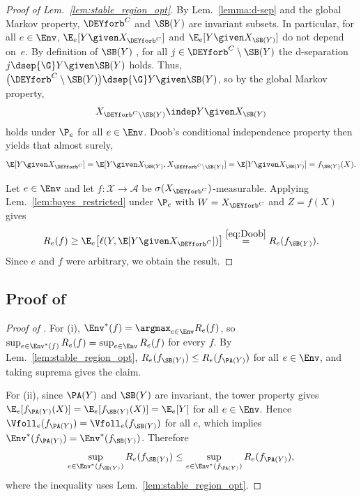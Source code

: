 \begin{proof}[Proof of Lem.~\ref{lem:stable_region_opt}]
By Lem.~\ref{lemma:d-sep} and the global Markov property,
$\DEYforb^C$ and $\SB(Y)$ are invariant subsets. In particular, for
all $e \in \Env$, $\E_e[Y \given X_{\DEYforb^C}]$ and
$\E_e[Y \given X_{\SB(Y)}]$ do not depend on~$e$. By definition of
$\SB(Y)$ \citep[Def.~3.4]{pfisterStabilizingVariableSelection2021}, for all $j \in \DEYforb^C \setminus \SB(Y)$ the
d-separation $j \dsep{\G} Y \given \SB(Y)$ holds. Thus,
$ \big(\DEYforb^C \setminus \SB(Y)\big) \dsep{\G} Y \given \SB(Y)$, so by the global Markov property,
$$
  X_{\DEYforb^C \setminus \SB(Y)} \indep Y \given X_{\SB(Y)}
$$
holds under $\P_e$ for all $e \in \Env$.
Doob's conditional independence property
\citep[Thm.~8.9]{kallenbergFoundationsModernProbability2021} then
yields that almost surely,
\begin{equation} \label{eq:Doob}
  \E[Y \given X_{\DEYforb^C}]
   = 
  \E[Y \given X_{\SB(Y)}, X_{\DEYforb^C \setminus \SB(Y)}]
   = 
  \E[Y \given X_{\SB(Y)}]
   = 
  f_{\SB(Y)}(X).
\end{equation}

Let $e \in \Env$ and let $f\colon \mathcal{X} \to \mathcal{A}$ be
$\sigma(X_{\DEYforb^C})$-measurable. Applying
Lem.~\ref{lem:bayes_restricted} under $\P_e$ with $W = X_{\DEYforb^C}$
and $Z = f(X)$ gives
$$
  R_e(f)
   \geq 
  \E_e \bigl[\ell(Y,  \E[Y \given X_{\DEYforb^C}])\bigr]
   \stackrel{\eqref{eq:Doob}}{=} 
  R_e(f_{\SB(Y)}).
$$
Since $e$ and $f$ were arbitrary, we obtain the result.
\end{proof}


\subsection{Proof of \texorpdfstring{}{Theorem~\ref{thm:PA_vs_SB_game}}}
\begin{proof}[Proof of ]
For (i), $\Env^*(f) = \argmax_{e \in \Env} R_e(f)$, so $\sup_{e \in \Env^*(f)} R_e(f) = \sup_{e \in \Env} R_e(f)$ for every $f$. By Lem.~\ref{lem:stable_region_opt}, $R_e(f_{\SB(Y)}) \leq R_e(f_{\PA(Y)})$ for all $e \in \Env$, and taking suprema gives the claim.

For (ii), since $\PA(Y)$ and $\SB(Y)$ are invariant, the tower property gives $\E_e[f_{\PA(Y)}(X)] = \E_e[f_{\SB(Y)}(X)] = \E_e[Y]$ for all $e \in \Env$. Hence $\Vfoll_e(f_{\PA(Y)}) = \Vfoll_e(f_{\SB(Y)})$ for all $e$, which implies $\Env^*(f_{\PA(Y)}) = \Env^*(f_{\SB(Y)})$. Therefore
\[
    \sup_{e \in \Env^*(f_{\SB(Y)})} R_e(f_{\SB(Y)})  \leq  \sup_{e \in \Env^*(f_{\PA(Y)})} R_e(f_{\PA(Y)}),
\]
where the inequality uses Lem.~\ref{lem:stable_region_opt}.
\end{proof}


